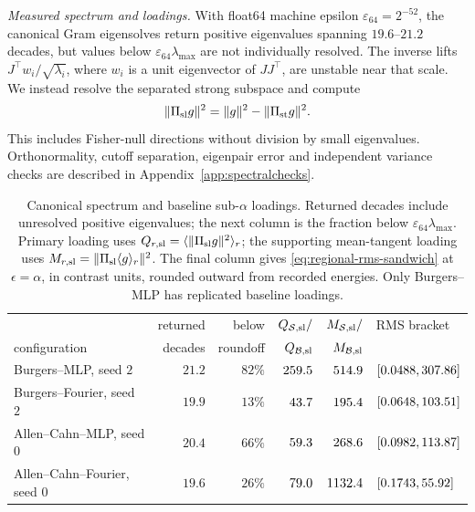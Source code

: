 \emph{Measured spectrum and loadings.}
With float64 machine epsilon $\varepsilon_{64}=2^{-52}$, the canonical Gram eigensolves
return positive eigenvalues spanning $19.6$--$21.2$ decades, but values below
$\varepsilon_{64}\lambda_{\max}$ are not individually resolved.
The inverse lifts $J^\top w_i/\sqrt{\lambda_i}$, where $w_i$ is a unit eigenvector
of $JJ^\top$, are unstable near that scale. We instead resolve the separated strong subspace and compute
\begin{equation*}
 \|\Pi_{\mathrm{sl}} g\|^2=\|g\|^2-\|\Pi_{\mathrm{st}} g\|^2.
\end{equation*}
This includes Fisher-null directions without division by small eigenvalues.
Orthonormality, cutoff separation, eigenpair error and independent variance checks
are described in Appendix~\ref{app:spectralchecks}.



\begin{table}[t]
\centering\small\setlength{\tabcolsep}{4pt}


\begin{tabular}{@{}lrrrrl@{}}
\toprule
 & returned & below & $Q_{\mathcal S,\rm sl}/$ & $M_{\mathcal S,\rm sl}/$ & RMS bracket\\
configuration & decades & roundoff & $Q_{\mathcal B,\rm sl}$ & $M_{\mathcal B,\rm sl}$ & \\
\midrule
Burgers--MLP, seed $2$ & $21.2$ & $82\%$ & $259.5$ & $514.9$ & $[0.0488,307.86]$\\
Burgers--Fourier, seed $2$ & $19.9$ & $13\%$ & $43.7$ & $195.4$ & $[0.0648,103.51]$\\
Allen--Cahn--MLP, seed $0$ & $20.4$ & $66\%$ & $59.3$ & $268.6$ & $[0.0982,113.87]$\\
Allen--Cahn--Fourier, seed $0$ & $19.6$ & $26\%$ & $79.0$ & $1132.4$ & $[0.1743,55.92]$\\
\bottomrule
\end{tabular}
\caption{Canonical spectrum and baseline sub-$\alpha$ loadings. Returned decades include
unresolved positive eigenvalues; the next column is the fraction below
$\varepsilon_{64}\lambda_{\max}$. Primary loading uses
$Q_{r,\rm sl}=\langle\|\Pi_{\mathrm{sl}} g\|^2\rangle_r$; the supporting mean-tangent loading
uses $M_{r,\rm sl}=\|\Pi_{\mathrm{sl}}\langle g\rangle_r\|^2$. The final column gives
\eqref{eq:regional-rms-sandwich} at $\epsilon=\alpha$, in contrast units, rounded
outward from recorded energies. Only Burgers--MLP has replicated baseline loadings.}
\label{tab:spectrum}\label{tab:loading}
\end{table}

